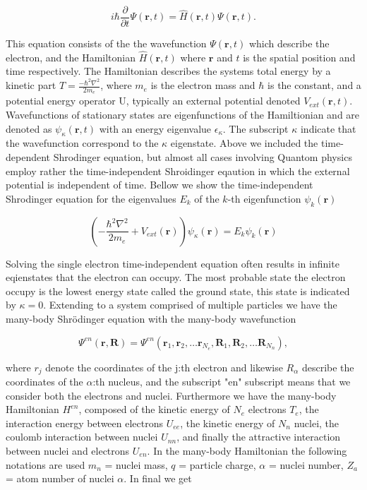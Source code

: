 \begin{equation}
    i\hbar\frac{\partial}{\partial t}\Psi(\boldsymbol{r}, t) = \hat{H}(\boldsymbol{r},t)\Psi(\boldsymbol{r}, t).
\end{equation}

This equation consists of the the wavefunction $\Psi(\boldsymbol{r},t)$ which describe the electron, and the Hamiltonian $\hat{H}(\boldsymbol{r},t)$ where $\boldsymbol{r}$ and $t$ is the spatial position and time respectively. The Hamiltonian describes the systems total energy by a kinetic part $T = \frac{-\hbar^2\nabla^2}{2m_e}$, where $m_e$ is the electron mass and $\hbar$ is the constant, and a potential energy operator U, typically an external potential denoted $V_{ext}(\boldsymbol{r}, t)$. Wavefunctions of stationary states are eigenfunctions of the Hamiltionian and are denoted as $\psi_{\kappa}(\boldsymbol{r}, t)$ with an energy eigenvalue $\epsilon_{\kappa}$. The subscript $\kappa$ indicate that the wavefunction correspond to the $\kappa$ eigenstate. Above we included the time-dependent Shrodinger equation, but almost all cases involving Quantom physics employ rather the time-independent Shroidinger eqaution in which the external potential is independent of time. Bellow we show the time-independent Shrodinger equation for the eigenvalues $E_k$ of the $k$-th eigenfunction $\psi_k(\boldsymbol{r})$

\begin{equation}
	\left(-\frac{\hbar^2\nabla^2}{2m_e} + V_{ext}(\boldsymbol{r}) \right)\psi_{\kappa}(\boldsymbol{r}) = E_k \psi_k(\boldsymbol{r})
\end{equation}

Solving the single electron time-independent equation often results in infinite eqienstates that the electron can occupy. The most probable state the electron occupy is the lowest energy state called the ground state, this state is indicated by $\kappa = 0$. Extending to a system comprised of multiple particles we have the many-body Shr\"{o}dinger equation with the many-body wavefunction 

\begin{equation}
\Psi^{en}(\boldsymbol{r}, \boldsymbol{R}) = \Psi^{en}(\boldsymbol{r}_1 , \boldsymbol{r}_2, \dots \boldsymbol{r}_{N_e}, \boldsymbol{R}_1, \boldsymbol{R}_2, \dots \boldsymbol{R}_{N_n}),
\end{equation}

where $r_j$ denote the coordinates of the j:th electron and likewise $R_{\alpha}$ describe the coordinates of the $\alpha$:th nucleus, and the subscript "en" subscript means that we consider both the electrons and nuclei. Furthermore we have the many-body Hamiltonian $H^{en}$, composed of the kinetic energy of $N_e$ electrons $T_e$, the interaction energy between electrons $U_{ee}$, the kinetic energy of $N_n$ nuclei, the coulomb interaction between nuclei $U_{nn}$, and finally the attractive interaction between nuclei and electrons $U_{en}$. In the many-body Hamiltonian the following notations are used $m_n$ = nuclei mass, $q$ = particle charge, $\alpha$ = nuclei number, $Z_a$ = atom number of nuclei $\alpha$. In final we get 

